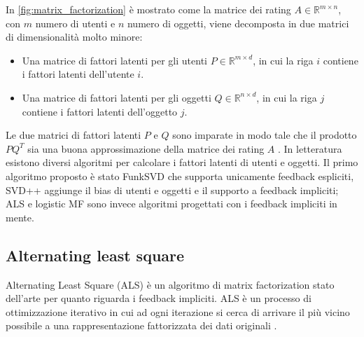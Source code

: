 In \autoref{fig:matrix_factorization} è mostrato come la matrice dei rating $A \in \mathbb{R}^{m \times n}$, con $m$ numero di utenti e $n$ numero di oggetti, viene decomposta in due matrici di dimensionalità molto minore:

\begin{itemize}
	\item Una matrice di fattori latenti per gli utenti $P \in \mathbb{R}^{m \times d}$, in cui la riga $i$ contiene i fattori latenti dell'utente $i$.
	\item Una matrice di fattori latenti per gli oggetti $Q \in \mathbb{R}^{n \times d}$, in cui la riga $j$ contiene i fattori latenti dell'oggetto $j$.
\end{itemize}
Le due matrici di fattori latenti $P$ e $Q$ sono imparate in modo tale che il prodotto $PQ^T$ sia una buona approssimazione della matrice dei rating $A$ \cite{mf-google}. In letteratura esistono diversi algoritmi per calcolare i fattori latenti di utenti e oggetti. Il primo algoritmo proposto è stato FunkSVD \cite{funk-mf} che supporta unicamente feedback espliciti, SVD++ \cite{svd++} aggiunge il bias di utenti e oggetti e il supporto a feedback impliciti; ALS \cite{als} e logistic MF \cite{logistic-mf} sono invece algoritmi progettati con i feedback impliciti in mente.


\subsection{Alternating least square} \label{subsec:als}
Alternating Least Square (ALS) \cite{als} è un algoritmo di matrix factorization stato dell'arte per quanto riguarda i feedback impliciti. ALS è un processo di ottimizzazione iterativo in cui ad ogni iterazione si cerca di arrivare il più vicino possibile a una rappresentazione fattorizzata dei dati originali \cite{als-medium}. 

